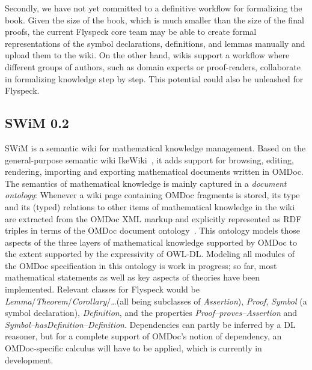 \documentclass{llncs}
\begin{document}
Secondly, we have not yet committed to a definitive workflow for formalizing the book.
Given the size of the book, which is much smaller than the size of the final
proofs, the current Flyspeck core team may be able to create formal
representations of the symbol declarations, definitions, and lemmas manually and upload
them to the wiki.  On the other hand, wikis support a workflow where different groups of
authors, such as domain experts or proof-readers, collaborate in formalizing knowledge
step by step.  This potential could also be unleashed for Flyspeck.

\subsection{SWiM 0.2}
\label{sec:swim}

SWiM is a semantic wiki for mathematical knowledge management.  Based on the
general-purpose semantic wiki IkeWiki~\cite{KrSchVr:semwiki-reasoning07}, it adds support
for browsing, editing, rendering, importing and exporting mathematical documents written
in OMDoc.  The semantics of mathematical knowledge is mainly captured in a \emph{document
  ontology}: Whenever a wiki page containing OMDoc fragments is stored, its type and its
(typed) relations to other items of mathematical knowledge in the wiki are extracted from
the OMDoc XML markup and explicitly represented as RDF triples in terms of the OMDoc
document ontology~\cite{OMDocDocOnto:web}.  This ontology models those aspects of the
three layers of mathematical knowledge supported by OMDoc to the extent supported by the
expressivity of OWL-DL.  Modeling all modules of the OMDoc specification in this ontology
is work in progress; so far, most mathematical statements as well as key aspects of
theories have been implemented.  Relevant classes for Flyspeck would be
\textit{Lemma}/\textit{Theorem}/\textit{Corollary}/\ldots (all being subclasses of
\textit{Assertion}), \textit{Proof}, \textit{Symbol} (a symbol declaration),
\textit{Definition}, and the properties \textit{Proof--proves--Assertion} and
\textit{Symbol--hasDefinition--Definition}.  Dependencies can partly be inferred by a DL
reasoner, but for a complete support of OMDoc's notion of dependency, an OMDoc-specific
calculus will have to be applied, which is currently in development.
\end{document}
